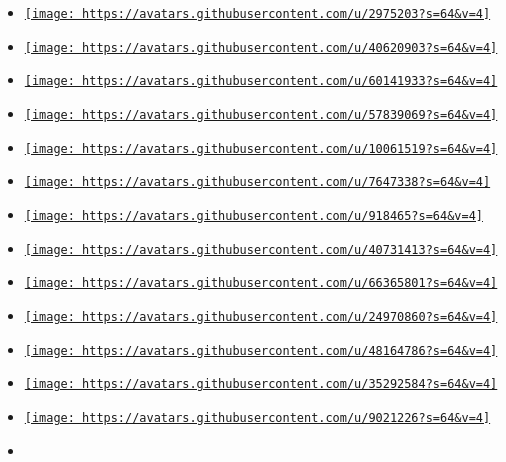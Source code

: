 \begin{itemize}
\tightlist
\item
  \href{https://github.com/bluebear94}{\texttt{[image: https://avatars.githubusercontent.com/u/2975203?s=64\&v=4]}}
\item
  \href{https://github.com/figsoda}{\texttt{[image: https://avatars.githubusercontent.com/u/40620903?s=64\&v=4]}}
\item
  \href{https://github.com/sitandr}{\texttt{[image: https://avatars.githubusercontent.com/u/60141933?s=64\&v=4]}}
\item
  \href{https://github.com/MDLC01}{\texttt{[image: https://avatars.githubusercontent.com/u/57839069?s=64\&v=4]}}
\item
  \href{https://github.com/Mafii}{\texttt{[image: https://avatars.githubusercontent.com/u/10061519?s=64\&v=4]}}
\item
  \href{https://github.com/azerupi}{\texttt{[image: https://avatars.githubusercontent.com/u/7647338?s=64\&v=4]}}
\item
  \href{https://github.com/damaxwell}{\texttt{[image: https://avatars.githubusercontent.com/u/918465?s=64\&v=4]}}
\item
  \href{https://github.com/AndyBarcia}{\texttt{[image: https://avatars.githubusercontent.com/u/40731413?s=64\&v=4]}}
\item
  \href{https://github.com/DVDTSB}{\texttt{[image: https://avatars.githubusercontent.com/u/66365801?s=64\&v=4]}}
\item
  \href{https://github.com/Jollywatt}{\texttt{[image: https://avatars.githubusercontent.com/u/24970860?s=64\&v=4]}}
\item
  \href{https://github.com/Luis-Licea}{\texttt{[image: https://avatars.githubusercontent.com/u/48164786?s=64\&v=4]}}
\item
  \href{https://github.com/Myriad-Dreamin}{\texttt{[image: https://avatars.githubusercontent.com/u/35292584?s=64\&v=4]}}
\item
  \href{https://github.com/PgBiel}{\texttt{[image: https://avatars.githubusercontent.com/u/9021226?s=64\&v=4]}}
\item

\end{itemize}
